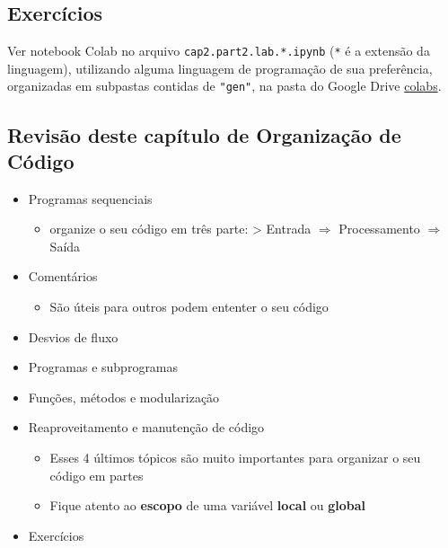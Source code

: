 \documentclass[12pt,a4paper]{article}
\providecommand{\tightlist}{%
      \setlength{\itemsep}{0pt}\setlength{\parskip}{0pt}}
\begin{document}
    \hypertarget{exercuxedcios}{%
\subsection{Exercícios}\label{exercuxedcios}}

    Ver notebook Colab no arquivo \texttt{cap2.part2.lab.*.ipynb}
(\texttt{*} é a extensão da linguagem), utilizando alguma linguagem de
programação de sua preferência, organizadas em subpastas contidas de
\texttt{"gen"}, na pasta do Google Drive
\href{https://drive.google.com/drive/folders/1YlFwv8XYN7PYYf-HwDMlkxzbmXzJw9cM?usp=sharing}{colabs}.

    \hypertarget{revisuxe3o-deste-capuxedtulo-de-organizauxe7uxe3o-de-cuxf3digo}{%
\subsection{Revisão deste capítulo de Organização de
Código}\label{revisuxe3o-deste-capuxedtulo-de-organizauxe7uxe3o-de-cuxf3digo}}

\begin{itemize}
\tightlist
\item
  Programas sequenciais

  \begin{itemize}
  \tightlist
  \item
    organize o seu código em três parte: \textgreater{} Entrada
    \(\Rightarrow\) Processamento \(\Rightarrow\) Saída
  \end{itemize}
\item
  Comentários

  \begin{itemize}
  \tightlist
  \item
    São úteis para outros podem ententer o seu código
  \end{itemize}
\item
  Desvios de fluxo
\item
  Programas e subprogramas
\item
  Funções, métodos e modularização
\item
  Reaproveitamento e manutenção de código

  \begin{itemize}
  \tightlist
  \item
    Esses 4 últimos tópicos são muito importantes para organizar o seu
    código em partes
  \item
    Fique atento ao \textbf{escopo} de uma variável \textbf{local} ou
    \textbf{global}
  \end{itemize}
\item
  Exercícios
\end{itemize}
\end{document}
